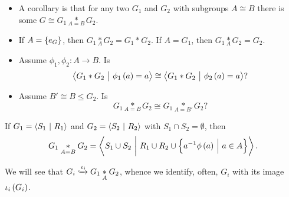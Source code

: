 \begin{remark}
\hfill
\begin{itemize}
\item A corollary is that for any two $ G_1 $ and $ G_2 $ with subgroups $ A \cong B $ there is some $ G \cong G_1 \underset{A = B}{*} G_2 $.
\item If $ A = \cbr{e_G} $, then $ G_1 \underset{A}{*} G_2 = G_1 * G_2 $. If $ A = G_1 $, then $ G_1 \underset{A}{*} G_2 = G_2 $.
\end{itemize}
\end{remark}

\begin{exercise}
\hfill
\begin{itemize}
\item Assume $ \phi_1, \phi_2 : A \to B $. Is
$$ \abr{G_1 * G_2 \st \phi_1\br{a} = a} \cong \abr{G_1 * G_2 \st \phi_2\br{a} = a}? $$
\item Assume $ B' \cong B \le G_2 $. Is
$$ G_1 \underset{A = B}{*} G_2 \cong G_1 \underset{A = B'}{*} G_2? $$
\end{itemize}
\end{exercise}

\begin{exercise}
\label{ex:3.2.4}
If $ G_1 = \left\langle S_1 \ \middle| \  R_1 \right\rangle $ and $ G_2 = \left\langle S_2 \ \middle| \  R_2 \right\rangle $ with $ S_1 \cap S_2 = \emptyset $, then
$$ G_1 \underset{A = B}{*} G_2 = \abr{S_1 \cup S_2 \st R_1 \cup R_2 \cup \cbr{a^{-1}\phi\br{a} \st a \in A}}. $$
\end{exercise}

We will see that $ G_i \xhookrightarrow{\iota_i} G_1 \underset{A}{*} G_2 $, whence we identify, often, $ G_i $ with its image $ \iota_i\br{G_i} $.

\pagebreak


